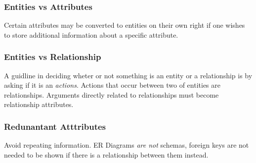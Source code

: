 \documentclass[11pt,a4paper,twocolumn]{book}
\begin{document}
\subsubsection{Entities vs Attributes}

Certain attributes may be converted to entities on their own right if one wishes to store additional information about a specific attribute.

\subsubsection{Entities vs Relationship}

A guidline in deciding wheter or not something is an entity or a relationship is by asking if it is an \textit{actions}. Actions that occur between two of entities are relationships. Arguments directly related to relationships must become relationship attributes.

\subsubsection{Redunantant Atttributes}

Avoid repeating information. ER Diagrams \textit{are not} schemas, foreign keys are not needed to be shown if there is a relationship between them instead.
\end{document}
